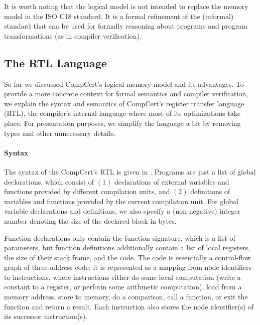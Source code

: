 It is worth noting that the logical model is not intended to replace the memory model in the ISO C18
standard.  It is a formal refinement of the (informal) standard that can be used for formally
reasoning about programs and program transformations (as in compiler verification).


\subsection{The RTL Language}
\label{sec:background:rtl}

So far we discussed CompCert's logical memory model and its advantages.  To provide a more concrete
context for formal semantics and compiler verification, we explain the syntax and semantics of
CompCert's register transfer language (RTL), the compiler's internal language where most of its
optimizations take place.  For presentation purposes, we simplify the language a bit by removing
types and other unnecessary details.



\paragraph{Syntax}



The syntax of the CompCert's RTL is given in .  Programs are just a list
of global declarations, which consist of $(1)$ declarations of external variables and functions
provided by different compilation units, and $(2)$ definitions of variables and functions provided
by the current compilation unit.  For global variable declarations and definitions, we also specify
a (non-negative) integer number denoting the size of the declared block in bytes.

Function declarations only contain the function signature, which is a list of parameters, but
function definitions additionally contain a list of local registers, the size of their stack frame,
and the code.  The code is essentially a control-flow graph of three-address code: it is represented
as a mapping from node identifiers to instructions, where instructions either
%
do some local computation (\eg write a constant to a register, or perform some arithmetic
computation),
%
load from a memory address, 
%
store to memory,
%
do a comparison,
%
call a function, 
%
or exit the function and return a result. 
%
Each instruction also stores the node identifier(s) of its successor instruction(s).

